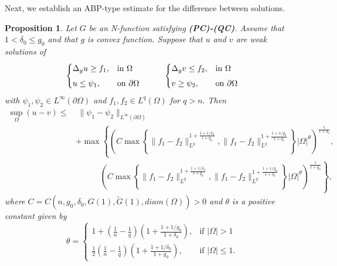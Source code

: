 \documentclass[11pt, leqno]{article}
\newtheorem{proposition}[theorem]{Proposition}
\theoremstyle{definition}
\theoremstyle{remark}
\numberwithin{equation}{section}
\begin{document}
Next, we establish an ABP-type estimate for the difference between solutions.

\begin{proposition}\label{abp}
    Let $G$ be an N-function satisfying {\bf (PC)-(QC)}. Assume that $1<\delta_0\leq g_0$ and that $g$ is convex function. Suppose that $u$ and $v$ are weak solutions of
    $$
   \begin{array}{c c}
    \begin{cases}
        \Delta_g u \geq f_1, & \text{in } \Omega \\[4pt]
        u \leq \psi_1, & \text{on } \partial\Omega
    \end{cases}
    \quad&\quad
    \begin{cases}
        \Delta_g v \leq f_2, & \text{in } \Omega \\[4pt]
        v \geq \psi_2, & \text{on } \partial\Omega
    \end{cases}
\end{array}
    $$
with $\psi_1,\psi_2\in L^\infty(\partial\Omega)$ and $f_1, f_2\in L^q(\Omega)$ for $q>n.$ Then
\begin{align*}
\sup_\Omega(u-v) \leq &\; \|\psi_1-\psi_2\|_{L^\infty(\partial\Omega)} \\
&+ \max \left\{ 
\left( C \max\left\{ 
\|f_1-f_2\|_{L^q}^{1+ \frac{1+1/\delta_0}{1+g_0}}, 
\|f_1-f_2\|_{L^q}^{1+ \frac{1+1/g_0}{1+\delta_0}}
\right\} |\Omega|^\theta \right)^{\frac{1}{1+\delta_0}}, \right. \\
&\qquad\quad \left.
\left( C \max\left\{ 
\|f_1-f_2\|_{L^q}^{1+ \frac{1+1/\delta_0}{1+g_0}}, 
\|f_1-f_2\|_{L^q}^{1+ \frac{1+1/g_0}{1+\delta_0}}
\right\} |\Omega|^\theta \right)^{\frac{1}{1+g_0}} 
\right\},
\end{align*}
where $C=C(n,g_0,\delta_0,G(1),\tilde{G}(1),diam(\Omega))>0$ and $\theta$ is a positive constant given by
 $$\theta=
   \begin{cases}
    1+\left(\frac{1}{n}-\frac{1}{q}\right)\left(1+ \frac{1+1/g_0}{1+\delta_0} \right), & \text{if } |\Omega| > 1 \\
    \frac{1}{2}\left(\frac{1}{n}-\frac{1}{q}\right)\left(1+\frac{1+1/\delta_0}{1+g_0}\right), & \text{if } |\Omega| \leq 1.
   \end{cases}
    $$
    
\end{proposition}
\end{document}
